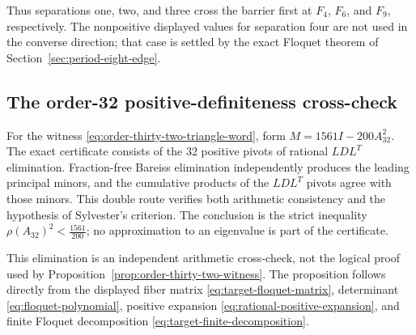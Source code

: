 \begin{table}[H]
\centering
\caption{Moment and excess sequences for separated period-eight defect pairs.}
\label{tab:separated-defect-moments}
\begingroup
\renewcommand{\arraystretch}{1.12}
\scriptsize
{}
\endgroup
\end{table}

Thus separations one, two, and three cross the barrier first at \(F_{4}\), \(F_{6}\),
and \(F_{9}\), respectively. The nonpositive displayed values for separation four
are not used in the converse direction; that case is settled by the exact
Floquet theorem of Section~\ref{sec:period-eight-edge}.

\subsection{The order-32 positive-definiteness cross-check}

For the witness \eqref{eq:order-thirty-two-triangle-word}, form \(M=1561I-200A_{32}^{2}\). The exact certificate consists
of the 32 positive pivots of rational \(LDL^T\) elimination. Fraction-free
Bareiss elimination independently produces the leading principal minors, and
the cumulative products of the \(LDL^T\) pivots agree with those minors. This
double route verifies both arithmetic consistency and the hypothesis of
Sylvester's criterion. The conclusion is the strict inequality
\(\rho(A_{32})^{2}<\frac{1561}{200}\); no approximation to an eigenvalue is part of the
certificate.

This elimination is an independent arithmetic cross-check, not the logical
proof used by Proposition~\ref{prop:order-thirty-two-witness}. The proposition follows directly from the
displayed fiber matrix \eqref{eq:target-floquet-matrix}, determinant \eqref{eq:floquet-polynomial}, positive expansion \eqref{eq:rational-positive-expansion},
and finite Floquet decomposition \eqref{eq:target-finite-decomposition}.
